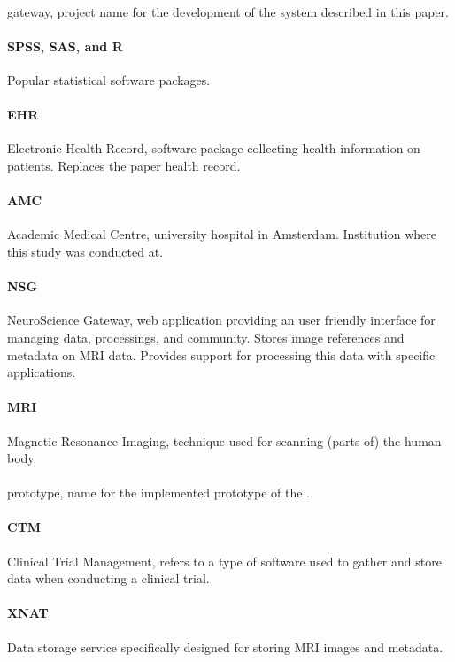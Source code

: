 \paragraph{\ivfsystem{}}
\project{} gateway, project name for the development of the system described in this paper.

\paragraph{SPSS, SAS, and R}
Popular statistical software packages.

\paragraph{EHR}
Electronic Health Record, software package collecting health information on patients.
Replaces the paper health record.

\paragraph{AMC}
Academic Medical Centre, university hospital in Amsterdam.
Institution where this study was conducted at.

\paragraph{NSG}
NeuroScience Gateway, web application providing an user friendly interface for managing data, processings, and community.
Stores image references and metadata on MRI data.
Provides support for processing this data with specific applications.

\paragraph{MRI}
Magnetic Resonance Imaging, technique used for scanning (parts of) the human body.

\paragraph{\ivfprototype{}}
\project{} prototype, name for the implemented prototype of the \ivfsystem{}.

\paragraph{CTM}
Clinical Trial Management, refers to a type of software used to gather and store data when conducting a clinical trial.

\paragraph{XNAT}
Data storage service specifically designed for storing MRI images and metadata.